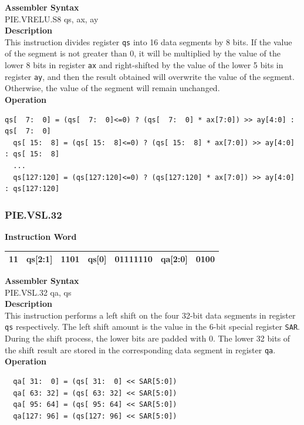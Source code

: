 \textbf{Assembler Syntax} \\
PIE.VRELU.S8 qs, ax, ay \\
\textbf{Description} \\
This instruction divides register \lstinline{qs} into 16 data segments by 8 bits. If the value of the segment is not greater than 0, it will be multiplied by the value of the lower 8 bits in register \lstinline{ax} and right-shifted by the value of the lower 5 bits in register \lstinline{ay}, and then the result obtained will overwrite the value of the segment. Otherwise, the value of the segment will remain unchanged.\\
\textbf{Operation}
\begin{lstlisting}[escapeinside=`?]
  qs[  7:  0] = (qs[  7:  0]<=0) ? (qs[  7:  0] * ax[7:0]) >> ay[4:0] : qs[  7:  0]
  qs[ 15:  8] = (qs[ 15:  8]<=0) ? (qs[ 15:  8] * ax[7:0]) >> ay[4:0] : qs[ 15:  8]
  ...
  qs[127:120] = (qs[127:120]<=0) ? (qs[127:120] * ax[7:0]) >> ay[4:0] : qs[127:120]
\end{lstlisting}

\newpage
\subsubsection{PIE.VSL.32}\label{instruction:PIEVSL32}
\setlength\tabcolsep{6pt}
\textbf{Instruction Word} \\
\begin{tabular}{|c|c|c|c|c|c|c|}
	\hline
	11 & qs[2:1] & 1101 & qs[0] & 01111110 & qa[2:0] & 0100 \\
	\hline
\end{tabular}

\textbf{Assembler Syntax} \\
PIE.VSL.32 qa, qs \\
\textbf{Description} \\
This instruction performs a left shift on the four 32-bit data segments in register \lstinline{qs} respectively. The left shift amount is the value in the 6-bit special register \lstinline{SAR}. During the shift process, the lower bits are padded with 0. The lower 32 bits of the shift result are stored in the corresponding data segment in register \lstinline{qa}.\\
\textbf{Operation}
\begin{lstlisting}
  qa[ 31:  0] = (qs[ 31:  0] << SAR[5:0])
  qa[ 63: 32] = (qs[ 63: 32] << SAR[5:0])
  qa[ 95: 64] = (qs[ 95: 64] << SAR[5:0])
  qa[127: 96] = (qs[127: 96] << SAR[5:0])
\end{lstlisting}




